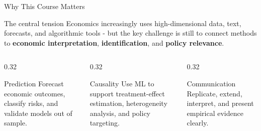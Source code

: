\documentclass[aspectratio=169,11pt]{beamer}
\begin{document}
\begin{frame}{Why This Course Matters}
\begin{block}{The central tension}
Economics increasingly uses high-dimensional data, text, forecasts, and algorithmic tools - but the key challenge is still to connect methods to \textbf{economic interpretation}, \textbf{identification}, and \textbf{policy relevance}.
\end{block}

\vspace{0.4em}
\begin{columns}[T,onlytextwidth]
\begin{column}{0.32\textwidth}
\begin{block}{Prediction}
Forecast economic outcomes, classify risks, and validate models out of sample.
\end{block}
\end{column}
\begin{column}{0.32\textwidth}
\begin{block}{Causality}
Use ML to support treatment-effect estimation, heterogeneity analysis, and policy targeting.
\end{block}
\end{column}
\begin{column}{0.32\textwidth}
\begin{block}{Communication}
Replicate, extend, interpret, and present empirical evidence clearly.
\end{block}
\end{column}
\end{columns}
\end{frame}
\end{document}
